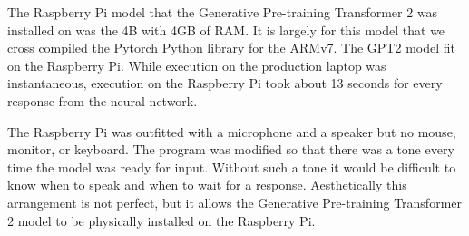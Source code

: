 The Raspberry Pi model that the Generative Pre-training Transformer 2 was installed on was the 4B with 4GB of RAM. It is largely for this model that we cross compiled the Pytorch Python library for the ARMv7. The GPT2 model fit on the Raspberry Pi. While execution on the production laptop was instantaneous, execution on the Raspberry Pi took about 13 seconds for every response from the neural network.

The Raspberry Pi was outfitted with a microphone and a speaker but no mouse, monitor, or keyboard. The program was modified so that there was a tone every time the model was ready for input. Without such a tone it would be difficult to know when to speak and when to wait for a response. Aesthetically this arrangement is not perfect, but it allows the Generative Pre-training Transformer 2 model to be physically installed on the Raspberry Pi.
